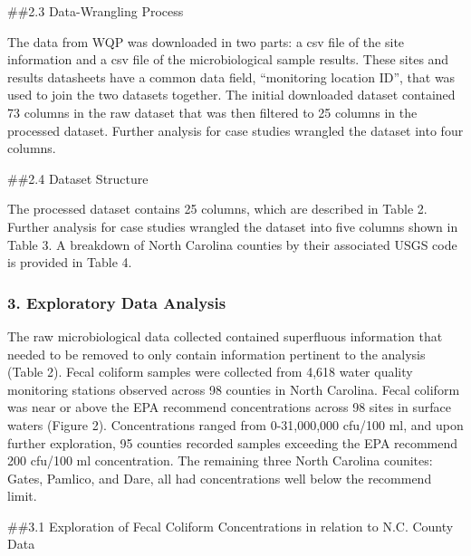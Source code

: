 \documentclass[12pt,]{article}
\begin{document}
\#\#2.3 Data-Wrangling Process

The data from WQP was downloaded in two parts: a csv file of the site
information and a csv file of the microbiological sample results. These
sites and results datasheets have a common data field, ``monitoring
location ID'', that was used to join the two datasets together. The
initial downloaded dataset contained 73 columns in the raw dataset that
was then filtered to 25 columns in the processed dataset. Further
analysis for case studies wrangled the dataset into four columns.

\#\#2.4 Dataset Structure

The processed dataset contains 25 columns, which are described in Table
2. Further analysis for case studies wrangled the dataset into five
columns shown in Table 3. A breakdown of North Carolina counties by
their associated USGS code is provided in Table 4.

\newpage

\hypertarget{exploratory-data-analysis}{%
\subsubsection{3. Exploratory Data
Analysis}\label{exploratory-data-analysis}}

The raw microbiological data collected contained superfluous information
that needed to be removed to only contain information pertinent to the
analysis (Table 2). Fecal coliform samples were collected from 4,618
water quality monitoring stations observed across 98 counties in North
Carolina. Fecal coliform was near or above the EPA recommend
concentrations across 98 sites in surface waters (Figure 2).
Concentrations ranged from 0-31,000,000 cfu/100 ml, and upon further
exploration, 95 counties recorded samples exceeding the EPA recommend
200 cfu/100 ml concentration. The remaining three North Carolina
counites: Gates, Pamlico, and Dare, all had concentrations well below
the recommend limit.

\#\#3.1 Exploration of Fecal Coliform Concentrations in relation to N.C.
County Data
\end{document}
